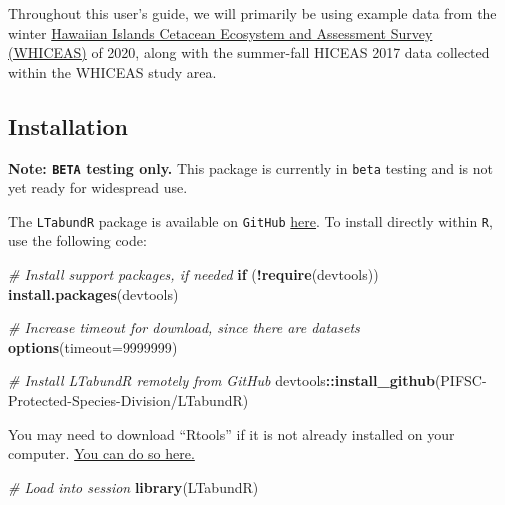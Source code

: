 \documentclass[
]{book}
\newenvironment{Shaded}{\begin{snugshade}}{\end{snugshade}}
\newcommand{\AttributeTok}[1]{\textcolor[rgb]{0.13,0.29,0.53}{#1}}
\newcommand{\CommentTok}[1]{\textcolor[rgb]{0.56,0.35,0.01}{\textit{#1}}}
\newcommand{\ControlFlowTok}[1]{\textcolor[rgb]{0.13,0.29,0.53}{\textbf{#1}}}
\newcommand{\DecValTok}[1]{\textcolor[rgb]{0.00,0.00,0.81}{#1}}
\newcommand{\FunctionTok}[1]{\textcolor[rgb]{0.13,0.29,0.53}{\textbf{#1}}}
\newcommand{\NormalTok}[1]{#1}
\newcommand{\SpecialCharTok}[1]{\textcolor[rgb]{0.81,0.36,0.00}{\textbf{#1}}}
\newcommand{\StringTok}[1]{\textcolor[rgb]{0.31,0.60,0.02}{#1}}
\begin{document}
Throughout this user's guide, we will primarily be using example data from the winter \href{https://repository.library.noaa.gov/view/noaa/47788}{Hawaiian Islands Cetacean Ecosystem and Assessment Survey (WHICEAS)} of 2020, along with the summer-fall HICEAS 2017 data collected within the WHICEAS study area.

\hypertarget{installation}{%
\subsection*{Installation}\label{installation}}

\textbf{Note: \texttt{BETA} testing only.} This package is currently in \texttt{beta} testing and is not yet ready for widespread use.

The \texttt{LTabundR} package is available on \texttt{GitHub} \href{https://github.com/PIFSC-Protected-Species-Division/LTabundR}{here}. To install directly within \texttt{R}, use the following code:

\begin{Shaded}
\begin{Highlighting}[]
\CommentTok{\# Install support packages, if needed}
\ControlFlowTok{if}\NormalTok{ (}\SpecialCharTok{!}\FunctionTok{require}\NormalTok{(}\StringTok{\textquotesingle{}devtools\textquotesingle{}}\NormalTok{)) }\FunctionTok{install.packages}\NormalTok{(}\StringTok{\textquotesingle{}devtools\textquotesingle{}}\NormalTok{)}

\CommentTok{\# Increase timeout for download, since there are datasets}
\FunctionTok{options}\NormalTok{(}\AttributeTok{timeout=}\DecValTok{9999999}\NormalTok{)}

\CommentTok{\# Install LTabundR remotely from GitHub}
\NormalTok{devtools}\SpecialCharTok{::}\FunctionTok{install\_github}\NormalTok{(}\StringTok{\textquotesingle{}PIFSC{-}Protected{-}Species{-}Division/LTabundR\textquotesingle{}}\NormalTok{)}
\end{Highlighting}
\end{Shaded}

You may need to download ``Rtools'' if it is not already installed on your computer. \href{https://cran.r-project.org/bin/windows/Rtools/}{You can do so here.}

\begin{Shaded}
\begin{Highlighting}[]
\CommentTok{\# Load into session}
\FunctionTok{library}\NormalTok{(LTabundR)}
\end{Highlighting}
\end{Shaded}
\end{document}
